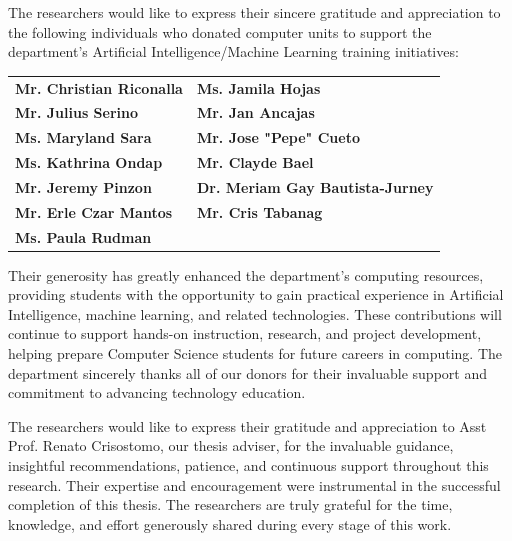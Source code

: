 \begin{acknowledgements}
The researchers would like to express their sincere gratitude and appreciation to the following individuals who donated computer units to support the department's Artificial Intelligence/Machine Learning training initiatives: 

\begin{center} 
\begin{tabular}{ll} 
\textbf{Mr. Christian Riconalla} & \textbf{Ms. Jamila Hojas} \\ 
\textbf{Mr. Julius Serino} & \textbf{Mr. Jan Ancajas} \\ 
\textbf{Ms. Maryland Sara} & \textbf{Mr. Jose "Pepe" Cueto} \\
\textbf{Ms. Kathrina Ondap} & \textbf{Mr. Clayde Bael} \\ 
\textbf{Mr. Jeremy Pinzon} & \textbf{Dr. Meriam Gay Bautista-Jurney} \\
\textbf{Mr. Erle Czar Mantos} & \textbf{Mr. Cris Tabanag} \\  
\textbf{Ms. Paula Rudman}
\end{tabular} 
\end{center} 

Their generosity has greatly enhanced the department's computing resources, providing students with the opportunity to gain practical experience in Artificial Intelligence, machine learning, and related technologies. These contributions will continue to support hands-on instruction, research, and project development, helping prepare Computer Science students for future careers in computing. 
The department sincerely thanks all of our donors for their invaluable support and commitment to advancing technology education.

The researchers would like to express their gratitude and appreciation to Asst Prof. Renato Crisostomo, our thesis adviser, for the invaluable guidance, insightful recommendations, patience, and continuous support throughout this research. Their expertise and encouragement were instrumental in the successful completion of this thesis.
The researchers are truly grateful for the time, knowledge, and effort generously shared during every stage of this work.
\end{acknowledgements}
